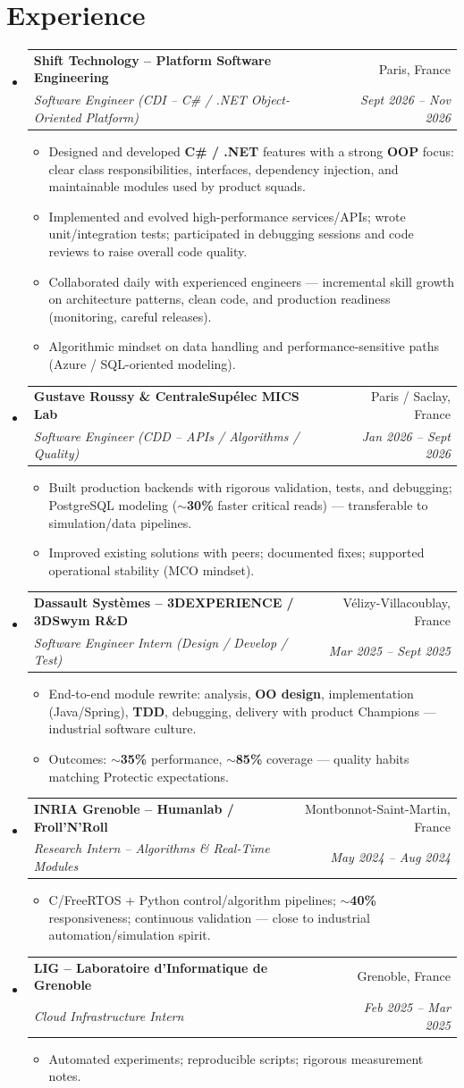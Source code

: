 \documentclass[letterpaper,10.5pt]{article}
\makeatletter
\newcommand{\resumeItem}[1]{\item\small{#1 \vspace{-1.5pt}}}
\newcommand{\resumeSubheading}[4]{\vspace{-1pt}\item\begin{tabular*}{0.97\textwidth}[t]{l@{\extracolsep{\fill}}r}\textbf{#1} & #2 \\\textit{\small#3} & \textit{\small #4} \\\end{tabular*}\vspace{-5pt}}
\newcommand{\resumeSubHeadingListStart}{\begin{itemize}[leftmargin=0.15in, label={}]}
\newcommand{\resumeSubHeadingListEnd}{\end{itemize}}
\newcommand{\resumeItemListStart}{\begin{itemize}[leftmargin=0.18in]}
\newcommand{\resumeItemListEnd}{\end{itemize}\vspace{-3pt}}
\makeatother
\begin{document}
\section{Experience}
\resumeSubHeadingListStart
  \resumeSubheading
    {Shift Technology -- Platform Software Engineering}{Paris, France}
    {Software Engineer (CDI -- C\# / .NET Object-Oriented Platform)}{Sept 2026 -- Nov 2026}
    \resumeItemListStart
      \resumeItem{Designed and developed \textbf{C\# / .NET} features with a strong \textbf{OOP} focus: clear class responsibilities, interfaces, dependency injection, and maintainable modules used by product squads.}
      \resumeItem{Implemented and evolved high-performance services/APIs; wrote unit/integration tests; participated in debugging sessions and code reviews to raise overall code quality.}
      \resumeItem{Collaborated daily with experienced engineers --- incremental skill growth on architecture patterns, clean code, and production readiness (monitoring, careful releases).}
      \resumeItem{Algorithmic mindset on data handling and performance-sensitive paths (Azure / SQL-oriented modeling).}
    \resumeItemListEnd
  \resumeSubheading
    {Gustave Roussy \& CentraleSup\'elec MICS Lab}{Paris / Saclay, France}
    {Software Engineer (CDD -- APIs / Algorithms / Quality)}{Jan 2026 -- Sept 2026}
    \resumeItemListStart
      \resumeItem{Built production backends with rigorous validation, tests, and debugging; PostgreSQL modeling (\textbf{$\sim$30\%} faster critical reads) --- transferable to simulation/data pipelines.}
      \resumeItem{Improved existing solutions with peers; documented fixes; supported operational stability (MCO mindset).}
    \resumeItemListEnd
  \resumeSubheading
    {Dassault Syst\`emes -- 3DEXPERIENCE / 3DSwym R\&D}{V\'elizy-Villacoublay, France}
    {Software Engineer Intern (Design / Develop / Test)}{Mar 2025 -- Sept 2025}
    \resumeItemListStart
      \resumeItem{End-to-end module rewrite: analysis, \textbf{OO design}, implementation (Java/Spring), \textbf{TDD}, debugging, delivery with product Champions --- industrial software culture.}
      \resumeItem{Outcomes: \textbf{$\sim$35\%} performance, \textbf{$\sim$85\%} coverage --- quality habits matching Protectic expectations.}
    \resumeItemListEnd
  \resumeSubheading
    {INRIA Grenoble -- Humanlab / Froll'N'Roll}{Montbonnot-Saint-Martin, France}
    {Research Intern -- Algorithms \& Real-Time Modules}{May 2024 -- Aug 2024}
    \resumeItemListStart
      \resumeItem{C/FreeRTOS + Python control/algorithm pipelines; \textbf{$\sim$40\%} responsiveness; continuous validation --- close to industrial automation/simulation spirit.}
    \resumeItemListEnd
  \resumeSubheading
    {LIG -- Laboratoire d'Informatique de Grenoble}{Grenoble, France}
    {Cloud Infrastructure Intern}{Feb 2025 -- Mar 2025}
    \resumeItemListStart
      \resumeItem{Automated experiments; reproducible scripts; rigorous measurement notes.}
    \resumeItemListEnd
\resumeSubHeadingListEnd
\end{document}
